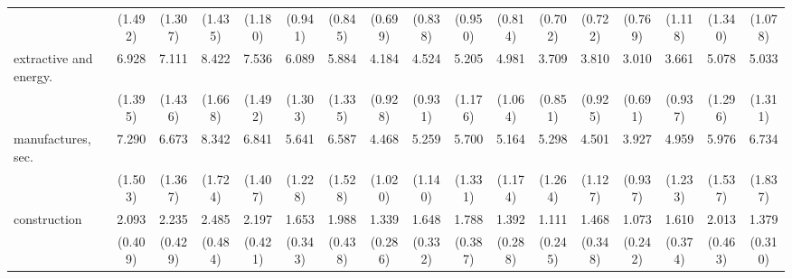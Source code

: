 {\begin{tabular}{l*{16}{c}}
                    &     (1.492)         &     (1.307)         &     (1.435)         &     (1.180)         &     (0.941)         &     (0.845)         &     (0.699)         &     (0.838)         &     (0.950)         &     (0.814)         &     (0.702)         &     (0.722)         &     (0.769)         &     (1.118)         &     (1.340)         &     (1.078)         \\
[1em]
extractive and energy.&       6.928\sym{***}&       7.111\sym{***}&       8.422\sym{***}&       7.536\sym{***}&       6.089\sym{***}&       5.884\sym{***}&       4.184\sym{***}&       4.524\sym{***}&       5.205\sym{***}&       4.981\sym{***}&       3.709\sym{***}&       3.810\sym{***}&       3.010\sym{***}&       3.661\sym{***}&       5.078\sym{***}&       5.033\sym{***}\\
                    &     (1.395)         &     (1.436)         &     (1.668)         &     (1.492)         &     (1.303)         &     (1.335)         &     (0.928)         &     (0.931)         &     (1.176)         &     (1.064)         &     (0.851)         &     (0.925)         &     (0.691)         &     (0.937)         &     (1.296)         &     (1.311)         \\
[1em]
manufactures, sec.  &       7.290\sym{***}&       6.673\sym{***}&       8.342\sym{***}&       6.841\sym{***}&       5.641\sym{***}&       6.587\sym{***}&       4.468\sym{***}&       5.259\sym{***}&       5.700\sym{***}&       5.164\sym{***}&       5.298\sym{***}&       4.501\sym{***}&       3.927\sym{***}&       4.959\sym{***}&       5.976\sym{***}&       6.734\sym{***}\\
                    &     (1.503)         &     (1.367)         &     (1.724)         &     (1.407)         &     (1.228)         &     (1.528)         &     (1.020)         &     (1.140)         &     (1.331)         &     (1.174)         &     (1.264)         &     (1.127)         &     (0.937)         &     (1.233)         &     (1.537)         &     (1.837)         \\
[1em]
construction        &       2.093\sym{***}&       2.235\sym{***}&       2.485\sym{***}&       2.197\sym{***}&       1.653\sym{*}  &       1.988\sym{**} &       1.339         &       1.648\sym{*}  &       1.788\sym{**} &       1.392         &       1.111         &       1.468         &       1.073         &       1.610\sym{*}  &       2.013\sym{**} &       1.379         \\
                    &     (0.409)         &     (0.429)         &     (0.484)         &     (0.421)         &     (0.343)         &     (0.438)         &     (0.286)         &     (0.332)         &     (0.387)         &     (0.288)         &     (0.245)         &     (0.348)         &     (0.242)         &     (0.374)         &     (0.463)         &     (0.310)         \\

\end{tabular}}
